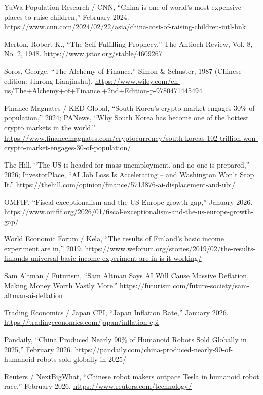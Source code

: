\documentclass[11pt,a4paper]{article}
\begin{document}
\noindent [27] YuWa Population Research / CNN, ``China is one of world's most expensive places to raise children,'' February 2024. \url{https://www.cnn.com/2024/02/22/asia/china-cost-of-raising-children-intl-hnk}

\noindent [28] Merton, Robert K., ``The Self-Fulfilling Prophecy,'' The Antioch Review, Vol. 8, No. 2, 1948. \url{https://www.jstor.org/stable/4609267}

\noindent [29] Soros, George, ``The Alchemy of Finance,'' Simon \& Schuster, 1987 (Chinese edition: Jinrong Lianjinshu). \url{https://www.wiley.com/en-us/The+Alchemy+of+Finance,+2nd+Edition-p-9780471445494}

\noindent [30] Finance Magnates / KED Global, ``South Korea's crypto market engages 30\% of population,'' 2024; PANews, ``Why South Korea has become one of the hottest crypto markets in the world.'' \url{https://www.financemagnates.com/cryptocurrency/south-koreas-102-trillion-won-crypto-market-engages-30-of-population/}

\noindent [31] The Hill, ``The US is headed for mass unemployment, and no one is prepared,'' 2026; InvestorPlace, ``AI Job Loss Is Accelerating -- and Washington Won't Stop It.'' \url{https://thehill.com/opinion/finance/5713876-ai-displacement-and-ubi/}

\noindent [32] OMFIF, ``Fiscal exceptionalism and the US-Europe growth gap,'' January 2026. \url{https://www.omfif.org/2026/01/fiscal-exceptionalism-and-the-us-europe-growth-gap/}

\noindent [33] World Economic Forum / Kela, ``The results of Finland's basic income experiment are in,'' 2019. \url{https://www.weforum.org/stories/2019/02/the-results-finlands-universal-basic-income-experiment-are-in-is-it-working/}

\noindent [34] Sam Altman / Futurism, ``Sam Altman Says AI Will Cause Massive Deflation, Making Money Worth Vastly More.'' \url{https://futurism.com/future-society/sam-altman-ai-deflation}

\noindent [35] Trading Economics / Japan CPI, ``Japan Inflation Rate,'' January 2026. \url{https://tradingeconomics.com/japan/inflation-cpi}

\noindent [36] Pandaily, ``China Produced Nearly 90\% of Humanoid Robots Sold Globally in 2025,'' February 2026. \url{https://pandaily.com/china-produced-nearly-90-of-humanoid-robots-sold-globally-in-2025/}

\noindent [37] Reuters / NextBigWhat, ``Chinese robot makers outpace Tesla in humanoid robot race,'' February 2026. \url{https://www.reuters.com/technology/}
\end{document}
